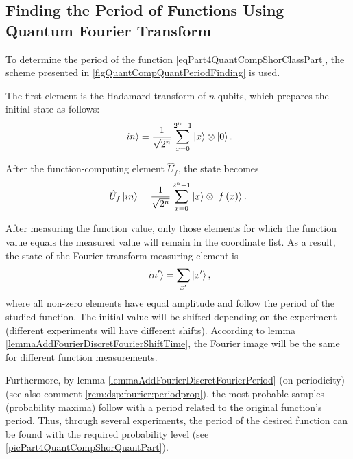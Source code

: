 \subsection{Finding the Period of Functions Using Quantum Fourier Transform}

To determine the period of the function \eqref{eqPart4QuantCompShorClassPart}, the scheme presented in \autoref{figQuantCompQuantPeriodFinding} is used.



The first element is the Hadamard transform of $n$ qubits, which prepares the initial state as follows:
\begin{equation}
\ket{in} = \frac{1}{\sqrt{2^n}}\sum_{x=0}^{2^n - 1} \ket{x} \otimes\ket{0}.
\nonumber
\end{equation}

After the function-computing element $\hat{U}_f$, the state becomes
\begin{equation}
\hat{U}_f\ket{in} = \frac{1}{\sqrt{2^n}}\sum_{x=0}^{2^n - 1} \ket{x} \otimes\left|f\left(x\right)\right>.
\nonumber
\end{equation} 



After measuring the function value, only those elements for which the function value equals the measured value will remain in the coordinate list. As a result, the state of the Fourier transform measuring element is 
\begin{equation}
\ket{in'} = \sum_{x'} \ket{x'},
\nonumber
\end{equation} 
where all non-zero elements have equal amplitude and follow the period of the studied function. The initial value will be shifted depending on the experiment (different experiments will have different shifts). According to lemma \ref{lemmaAddFourierDiscretFourierShiftTime}, the Fourier image will be the same for different function measurements.

Furthermore, by lemma \ref{lemmaAddFourierDiscretFourierPeriod} (on periodicity) (see also comment \ref{rem:dsp:fourier:periodprop}), the most probable samples (probability maxima) follow with a period related to the original function's period. Thus, through several experiments, the period of the desired function can be found with the required probability level (see \autoref{picPart4QuantCompShorQuantPart}).


